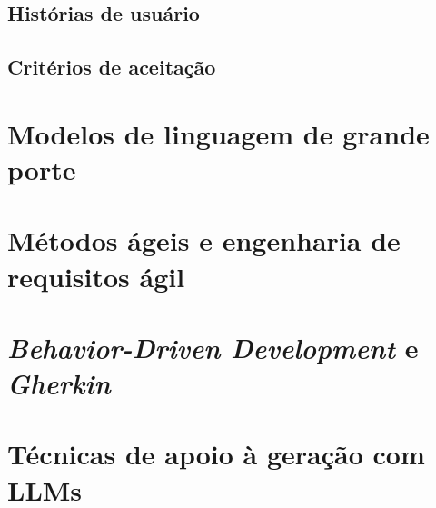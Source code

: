 \subsection{Histórias de usuário}

\subsection{Critérios de aceitação}

\section{Modelos de linguagem de grande porte}
\label{sec:llm}

\section{Métodos ágeis e engenharia de requisitos ágil}
\label{sec:ageis}

\section{\textit{Behavior-Driven Development} e \textit{Gherkin}}
\label{sec:bdd}

\section{Técnicas de apoio à geração com LLMs}
\label{sec:tecnicas-llm}

